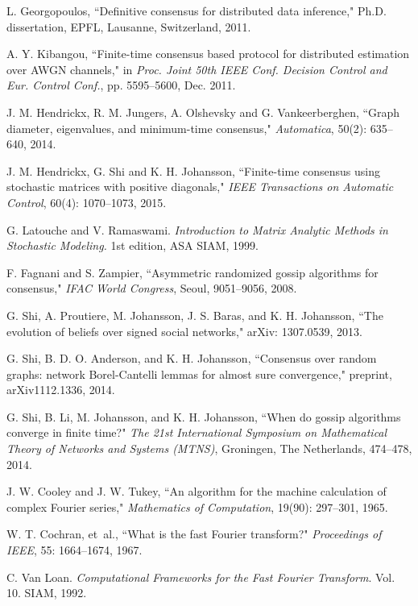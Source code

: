 \documentclass[a4paper, 11pt]{article}
\begin{document}
\begin{thebibliography}{99}
 L. Georgopoulos, ``Definitive consensus for distributed data inference,"
Ph.D. dissertation, EPFL, Lausanne, Switzerland, 2011.

 A. Y. Kibangou, ``Finite-time consensus based protocol for distributed estimation
over AWGN channels,"  in  {\em Proc. Joint 50th IEEE Conf. Decision
Control and Eur. Control Conf.},  pp. 5595–5600,  Dec. 2011.

J. M. Hendrickx, R. M. Jungers, A. Olshevsky and G. Vankeerberghen, ``Graph diameter, eigenvalues, and minimum-time consensus," {\em Automatica}, 50(2): 635--640, 2014.

J. M. Hendrickx, G. Shi and K. H. Johansson, ``Finite-time consensus using stochastic matrices with positive diagonals," {\em IEEE Transactions on Automatic Control}, 60(4): 1070--1073,  2015.


  G. Latouche  and V. Ramaswami. {\em  Introduction to Matrix Analytic Methods in Stochastic Modeling.} 1st edition, ASA SIAM, 1999.


 F. Fagnani  and S.  Zampier, ``Asymmetric randomized gossip algorithms for consensus," {\em IFAC World Congress}, Seoul, 9051--9056, 2008.


 G. Shi,  A. Proutiere, M. Johansson, J. S.  Baras, and K. H. Johansson, ``The evolution of beliefs over signed social networks," arXiv: 1307.0539, 2013.

 G. Shi, B. D. O. Anderson, and K. H. Johansson, ``Consensus over random graphs: network Borel-Cantelli lemmas for almost sure convergence,"  preprint, arXiv1112.1336, 2014.

   G. Shi,  B. Li,  M. Johansson, and K. H. Johansson, ``When do gossip algorithms converge in finite time?" {\em The 21st International Symposium on Mathematical Theory of Networks and Systems (MTNS)}, Groningen, The Netherlands, 474--478, 2014.






 J.  W. Cooley and J. W. Tukey, ``An algorithm for the machine calculation of complex Fourier series," {\em Mathematics of Computation}, 19(90):  297--301, 1965.


{  W. T. Cochran, et~al., ``What is the fast Fourier transform?" {\em Proceedings of IEEE}, 55: 1664--1674, 1967.}

{   C. Van Loan. {\em Computational Frameworks for the Fast Fourier Transform}. Vol. 10. SIAM, 1992.}


\end{thebibliography}
\end{document}
